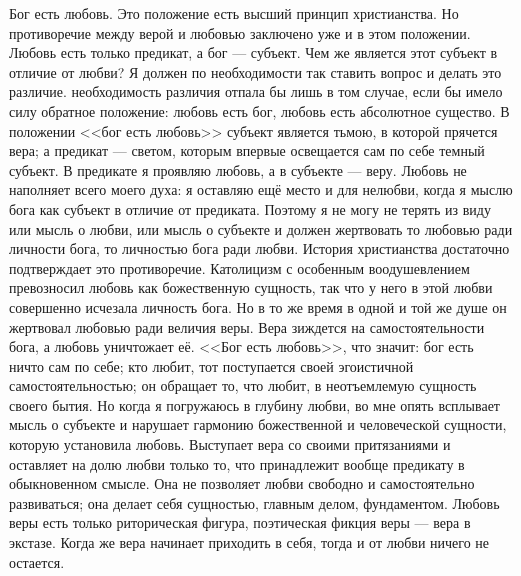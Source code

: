 \documentclass[12pt,oneside]{book}
\begin{document}
Бог есть любовь. Это положение есть высший принцип христианства. Но противоречие между верой и любовью заключено уже и в этом положении. Любовь есть только предикат, а бог --- субъект. Чем же является этот субъект в отличие от любви? Я должен по необходимости так ставить вопрос и делать это различие. необходимость различия отпала бы лишь в том случае, если бы имело силу обратное положение: любовь есть бог, любовь есть абсолютное существо. В положении <<бог есть любовь>> субъект является тьмою, в которой прячется вера; а предикат --- светом, которым впервые освещается сам по себе темный субъект. В предикате я проявляю любовь, а в субъекте --- веру. Любовь не наполняет всего моего духа: я оставляю ещё место и для нелюбви, когда я мыслю бога как субъект в отличие от предиката. Поэтому я не могу не терять из виду или мысль о любви, или мысль о субъекте и должен жертвовать то любовью ради личности бога, то личностью бога ради любви. История христианства достаточно подтверждает это противоречие. Католицизм с особенным воодушевлением превозносил любовь как божественную сущность, так что у него в этой любви совершенно исчезала личность бога. Но в то же время в одной и той же душе он жертвовал любовью ради величия веры. Вера зиждется на самостоятельности бога, а любовь уничтожает её. <<Бог есть любовь>>, что значит: бог есть ничто сам по себе; кто любит, тот поступается своей эгоистичной самостоятельностью; он обращает то, что любит, в неотъемлемую сущность своего бытия. Но когда я погружаюсь в глубину любви, во мне опять всплывает мысль о субъекте и нарушает гармонию божественной и человеческой сущности, которую установила любовь. Выступает вера со своими притязаниями и оставляет на долю любви только то, что принадлежит вообще предикату в обыкновенном смысле. Она не позволяет любви свободно и самостоятельно развиваться; она делает себя сущностью, главным делом, фундаментом. Любовь веры есть только риторическая фигура, поэтическая фикция веры --- вера в экстазе. Когда же вера начинает приходить в себя, тогда и от любви ничего не остается.
\end{document}
